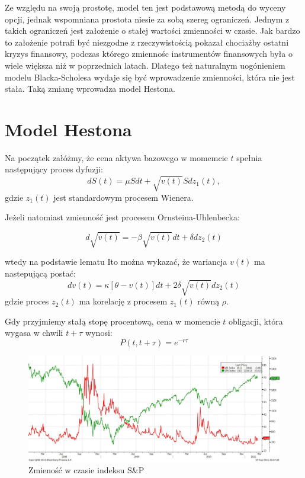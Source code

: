 \documentclass{pracamgr}
\begin{document}
Ze względu na swoją prostotę, model ten jest podstawową metodą do wyceny opcji, jednak wspomniana prostota niesie za sobą szereg ograniczeń. Jednym z takich ograniczeń jest założenie o stałej wartości zmienności w czasie. Jak bardzo to założenie potrafi być niezgodne z rzeczywistością pokazał chociażby ostatni kryzys finansowy, podczas którego zmiennośc instrumentów finansowych była o wiele większa niż w poprzednich latach. Dlatego też naturalnym uogónieniem modelu Blacka-Scholesa wydaje się być wprowadzenie zmienności, która nie jest stała. Taką zmianę wprowadza model Hestona. 

\section{Model Hestona}

Na początek załóżmy, że cena aktywa bazowego w momemcie $t$ spełnia następujący proces dyfuzji:
\begin{equation}
dS(t)= \mu S dt + \sqrt{v(t)} S d z_1 (t),
\end{equation}
gdzie $z_1(t)$  jest standardowym procesem Wienera. 

Jeżeli natomiast zmienność jest procesem Ornsteina-Uhlenbecka:

\begin{equation}
d \sqrt{v(t)} = - \beta \sqrt{v(t)} dt + \delta d z_2 (t)
\end{equation}

wtedy na podstawie lematu Ito można wykazać, że wariancja $v(t)$ ma nastepującą postać:
\begin{equation}
dv(t)= \kappa  [\theta -v(t)]dt+2\delta \sqrt{v(t)} d z_2 (t)
\end{equation}
gdzie proces $z_2(t)$ ma korelację z procesem $z_1(t)$ równą $\rho$.

Gdy przyjmiemy stałą stopę procentową, cena w momencie $t$ obligacji, która wygasa w chwili $t+\tau$ wynosi:
\begin{equation}
P(t, t+\tau) = e^{-r\tau}
\end{equation}



\begin{figure}
  \centering
  \includegraphics[width=150mm]{vix.jpg}
  \caption{Zmieność w czasie indeksu S\&P}\label{fig:vix}
\end{figure}
\end{document}
